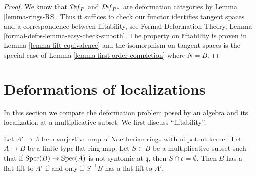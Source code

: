 \begin{proof}
We know that $\mathcal{D}\!\mathit{ef}_P$ and $\mathcal{D}\!\mathit{ef}_{P^\wedge}$
are deformation categories by Lemma \ref{lemma-rings-RS}.
Thus it suffices to check
our functor identifies tangent spaces and a correspondence
between liftability, see
Formal Deformation Theory, Lemma \ref{formal-defos-lemma-easy-check-smooth}.
The property on liftability is proven in
Lemma \ref{lemma-lift-equivalence}
and the isomorphism on tangent spaces is the special case of
Lemma \ref{lemma-first-order-completion} where $N = B$.
\end{proof}



\section{Deformations of localizations}
\label{section-compare-localization}

\noindent
In this section we compare the deformation problem posed
by an algebra and its localization at a multiplicative subset.
We first discuss ``liftability''.

\begin{lemma}
\label{lemma-lift-equivalence-localization}
Let $A' \to A$ be a surjective map of Noetherian rings with nilpotent kernel.
Let $A \to B$ be a finite type flat ring map.
Let $S \subset B$ be a multiplicative subset such that
if $\mathop{\mathrm{Spec}}(B) \to \mathop{\mathrm{Spec}}(A)$ is not syntomic at $\mathfrak q$,
then $S \cap \mathfrak q = \emptyset$.
Then $B$ has a flat lift to $A'$ if and only if
$S^{-1}B$ has a flat lift to $A'$.
\end{lemma}

